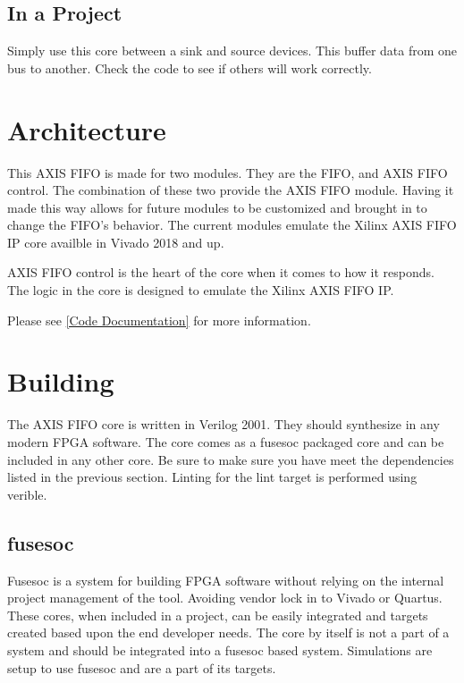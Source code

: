 

\subsection{In a Project}
\par
Simply use this core between a sink and source devices. This buffer data from one bus to another. Check the code to see if others will work correctly.

\section{Architecture}

\par
This AXIS FIFO is made for two modules. They are the FIFO, and AXIS FIFO control. The combination of these two provide the AXIS FIFO module.
Having it made this way allows for future modules to be customized and brought in to change the FIFO's behavior. The current modules emulate the Xilinx
AXIS FIFO IP core availble in Vivado 2018 and up.

\par
AXIS FIFO control is the heart of the core when it comes to how it responds. The logic in the core is designed to emulate the Xilinx AXIS FIFO IP.

Please see \ref{Code Documentation} for more information.

\section{Building}

\par
The AXIS FIFO core is written in Verilog 2001. They should synthesize in any modern FPGA software. The core comes as a fusesoc packaged core and can be
included in any other core. Be sure to make sure you have meet the dependencies listed in the previous section. Linting for the lint target is performed
using verible.

\subsection{fusesoc}
\par
Fusesoc is a system for building FPGA software without relying on the internal project management of the tool. Avoiding vendor lock in to Vivado or Quartus.
These cores, when included in a project, can be easily integrated and targets created based upon the end developer needs. The core by itself is not a part of
a system and should be integrated into a fusesoc based system. Simulations are setup to use fusesoc and are a part of its targets.

